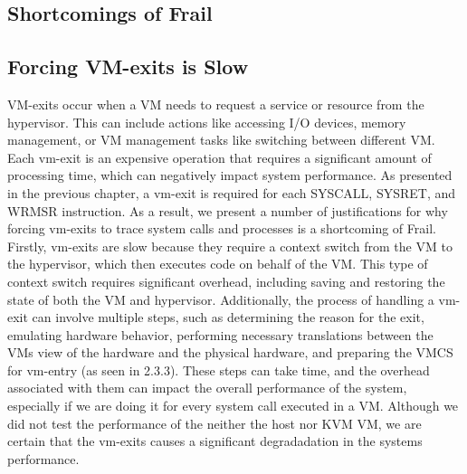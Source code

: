 \documentclass{report}
\begin{document}
\begin{spacing}{1.5}
\chapter{Shortcomings of Frail}

\section{Forcing VM-exits is Slow}

{\large
VM-exits occur when a VM needs to request a service or resource from the hypervisor. This can include actions like accessing I/O devices, memory management, or VM management tasks like switching between different VM. Each vm-exit is an expensive operation that requires a significant amount of processing time, which can negatively impact system performance. As presented in the previous chapter, a vm-exit is required for each SYSCALL, SYSRET, and WRMSR instruction. As a result, we present a number of justifications for why forcing vm-exits to trace system calls and processes is a shortcoming of Frail. Firstly, vm-exits are slow because they require a context switch from the VM to the hypervisor, which then executes code on behalf of the VM. This type of context switch requires significant overhead, including saving and restoring the state of both the VM and hypervisor. Additionally, the process of handling a vm-exit can involve multiple steps, such as determining the reason for the exit, emulating hardware behavior, performing necessary translations between the VMs view of the hardware and the physical hardware, and preparing the VMCS for vm-entry (as seen in 2.3.3). These steps can take time, and the overhead associated with them can impact the overall performance of the system, especially if we are doing it for every system call executed in a VM. Although we did not test the performance of the neither the host nor KVM VM, we are certain that the vm-exits causes a significant degradadation in the systems performance.  


}
\end{spacing}
\end{document}
